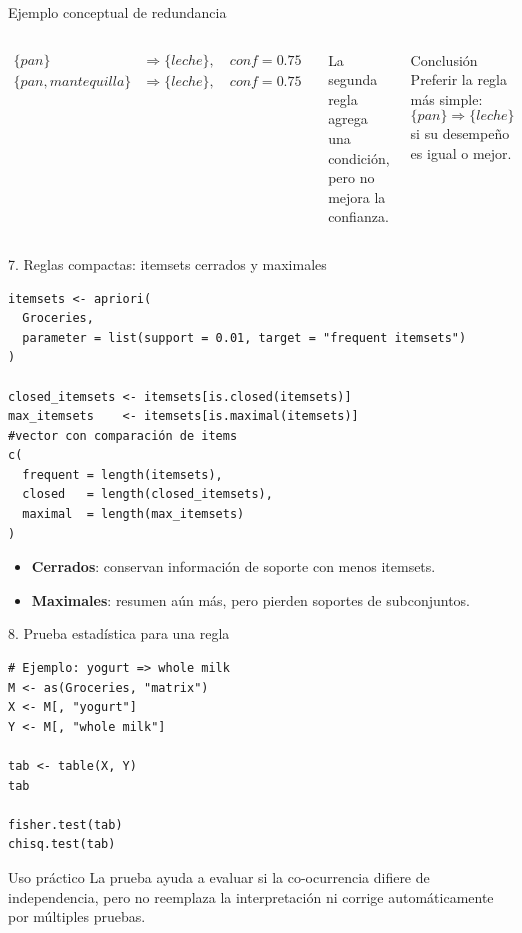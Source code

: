 \documentclass[10pt,aspectratio=169]{beamer}
\begin{document}
\begin{frame}{Ejemplo conceptual de redundancia}
\begin{columns}
\small
\begin{align*}
\{pan\} &\Rightarrow \{leche\},\quad conf=0.75 \\
\{pan, mantequilla\} &\Rightarrow \{leche\},\quad conf=0.75
\end{align*}

La segunda regla agrega una condición, pero no mejora la confianza.

\begin{exampleblock}{Conclusión}
Preferir la regla más simple:
\[
\{pan\}\Rightarrow\{leche\}
\]
si su desempeño es igual o mejor.
\end{exampleblock}
\end{columns}
\end{frame}

\begin{frame}[fragile]{7. Reglas compactas: itemsets cerrados y maximales}
\begin{lstlisting}[style=rcode]
itemsets <- apriori(
  Groceries,
  parameter = list(support = 0.01, target = "frequent itemsets")
)

closed_itemsets <- itemsets[is.closed(itemsets)]
max_itemsets    <- itemsets[is.maximal(itemsets)]
#vector con comparación de items
c(
  frequent = length(itemsets),
  closed   = length(closed_itemsets),
  maximal  = length(max_itemsets)
)
\end{lstlisting}

\begin{itemize}
  \item \textbf{Cerrados}: conservan información de soporte con menos itemsets.
  \item \textbf{Maximales}: resumen aún más, pero pierden soportes de subconjuntos.
\end{itemize}
\end{frame}

\begin{frame}[fragile]{8. Prueba estadística para una regla}
\begin{lstlisting}[style=rcode]
# Ejemplo: yogurt => whole milk
M <- as(Groceries, "matrix")
X <- M[, "yogurt"]
Y <- M[, "whole milk"]

tab <- table(X, Y)
tab

fisher.test(tab)
chisq.test(tab)
\end{lstlisting}

\begin{block}{Uso práctico}
La prueba ayuda a evaluar si la co-ocurrencia difiere de independencia, pero no reemplaza la interpretación ni corrige automáticamente por múltiples pruebas.
\end{block}
\end{frame}
\end{document}
